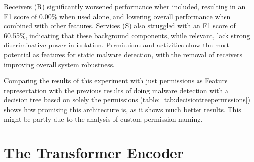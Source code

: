 Receivers (R) significantly worsened performance when included, 
resulting in an F1 score of 0.00\% when used alone, and lowering overall 
performance when combined with other features. 
Services (S) also struggled with an F1 score of 60.55\%, 
indicating that these background components, while relevant, 
lack strong discriminative power in isolation. 
Permissions and activities show the most potential as features for static malware detection, 
with the removal of receivers improving overall system robustness.

Comparing the results of this experiment with just permissions as Feature representation with 
the previous results of doing malware detection with a decision tree based on solely 
the permissions (table: \ref{tab:decisiontreepermissions}) shows how promising this architecture is, 
as it shows much better results.
This might be partly due to the analysis of custom permission naming.


\section{The Transformer Encoder}

\label{sec:tran_enc}

\begin{table}[b!]
    \caption{\label{tab:apk_representation_results_unfrozen}%
    Performance of different APK representations using \emph{unfrozen} modernBERT embeddings. Features are extracted from the Android manifest.xml (A=Activities, P=Permissions, R=Receivers, S=Services). The encoder was also trained through backpropagation in this experiment.}
\end{table}

